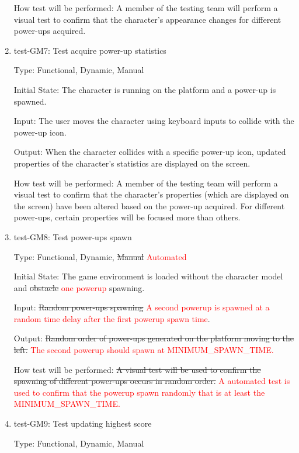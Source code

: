 \documentclass[12pt, titlepage]{article}
\begin{document}
\begin{enumerate}
How test will be performed: A member of the testing team will perform a visual test to confirm that the character's appearance changes for different power-ups acquired.

\item{test-GM7: Test acquire power-up statistics\\}

Type: Functional, Dynamic, Manual
					
Initial State: The character is running on the platform and a power-up is spawned.
					
Input: The user moves the character using keyboard inputs to collide with the power-up icon.

Output: When the character collides with a specific power-up icon, updated properties of the character's statistics are displayed on the screen.
					
How test will be performed: A member of the testing team will perform a visual test to confirm that the character's properties (which are displayed on the screen) have been altered based on the power-up acquired. For different power-ups, certain properties will be focused more than others. 

\item{test-GM8: Test power-ups spawn\\}

Type: Functional, Dynamic, \sout{Manual} \textcolor{red}{Automated}
					
Initial State: The game environment is loaded without the character model and \sout{obstacle} \textcolor{red}{one powerup} spawning.
					
Input: \sout{Random power-ups spawning} \textcolor{red}{A second powerup is spawned at a random time delay after the first powerup spawn time}.

Output: \sout{Random order of power-ups generated on the platform moving to the left.} \textcolor{red}{The second powerup should spawn at MINIMUM\_SPAWN\_TIME.}
					
How test will be performed: \sout{A visual test will be used to confirm the spawning of different power-ups occurs in random order.} \textcolor{red}{A automated test is used to confirm that the powerup spawn randomly that is at least the MINIMUM\_SPAWN\_TIME.}


\item{test-GM9: Test updating highest score\\}

Type: Functional, Dynamic, Manual
					

\end{enumerate}
\end{document}
